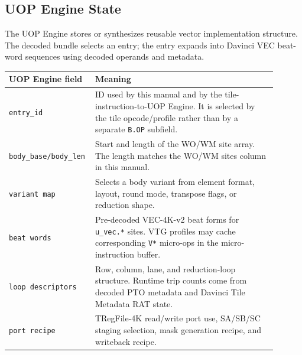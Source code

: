 \subsection{UOP Engine State}
The UOP Engine stores or synthesizes reusable vector implementation structure. The decoded bundle selects an entry; the entry expands into Davinci VEC beat-word sequences using decoded operands and metadata.
\begin{longtable}{@{}L{0.24\linewidth}L{0.66\linewidth}@{}}
\toprule
UOP Engine field & Meaning \\
\midrule
\texttt{entry\_id} & ID used by this manual and by the tile-instruction-to-UOP Engine. It is selected by the tile opcode/profile rather than by a separate \texttt{B.OP} subfield. \\
\texttt{body\_base/body\_len} & Start and length of the WO/WM site array. The length matches the WO/WM sites column in this manual. \\
\texttt{variant map} & Selects a body variant from element format, layout, round mode, transpose flags, or reduction shape. \\
\texttt{beat words} & Pre-decoded VEC-4K-v2 beat forms for \texttt{u\_vec.*} sites. VTG profiles may cache corresponding \texttt{V*} micro-ops in the micro-instruction buffer. \\
\texttt{loop descriptors} & Row, column, lane, and reduction-loop structure. Runtime trip counts come from decoded PTO metadata and Davinci Tile Metadata RAT state. \\
\texttt{port recipe} & TRegFile-4K read/write port use, SA/SB/SC staging selection, mask generation recipe, and writeback recipe. \\
\bottomrule
\end{longtable}



